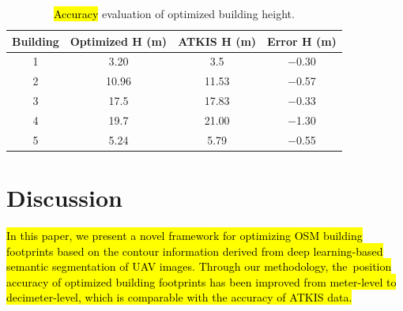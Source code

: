 \begin{table}[H]
  \centering
  \caption{\hl{Accuracy} %
  evaluation of optimized building height.}
    \begin{tabular}{cccc}
    \toprule
    \textbf{Building} & \textbf{Optimized H (m)} & \textbf{ATKIS H (m)} & \textbf{Error H (m)} \\
          
    \midrule
    1     & 3.20  & 3.5   & $-$0.30\\
    2     & 10.96 & 11.53 & $-$0.57 \\
    3     & 17.5  & 17.83 & $-$0.33  \\
    4     & 19.7  & 21.00 & $-$1.30  \\
    5     & 5.24  & 5.79 & $-$0.55  \\
    \bottomrule
    \end{tabular}%
  \label{tab:error_h}%
\end{table}%












\section{Discussion}\label{sec:conclu}
\hl{In this paper, we present a novel framework for optimizing OSM building footprints based on the contour information derived from deep learning-based semantic segmentation of UAV images. Through our methodology, the~position accuracy of optimized building footprints has been improved from meter-level to decimeter-level, which is comparable with the accuracy of ATKIS data.}

